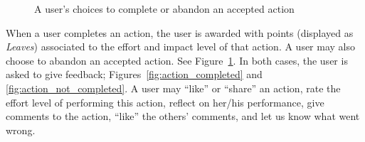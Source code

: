 \begin{figure}
\begin{center}
	   \caption{A user's choices to complete or abandon an accepted action}\label{fig:action_how}
\end{center}
\end{figure} 

When a user completes an action, the user is awarded with points (displayed as \textit{Leaves}) associated to the effort and impact level of that action. 
A user may also choose to abandon an accepted action. See Figure~\ref{fig:action_how}. In both cases, the user is asked to give feedback; Figures~\ref{fig:action_completed} and \ref{fig:action_not_completed}. 
A user may ``like'' or ``share'' an action, rate the effort level of performing this action, reflect on her/his performance, give comments to the action, ``like'' the others' comments, and let us know what went wrong. 

